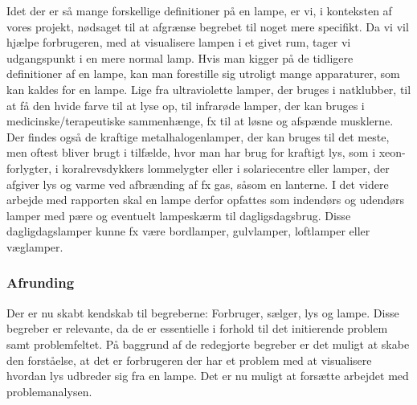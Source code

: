 Idet der er så mange forskellige definitioner på en lampe, er vi, i konteksten af vores projekt, nødsaget til at afgrænse begrebet til noget mere specifikt. Da vi vil hjælpe forbrugeren, med at visualisere lampen i et givet rum, tager vi udgangspunkt i en mere normal lamp. Hvis man kigger på de tidligere definitioner af en lampe, kan man forestille sig utroligt mange apparaturer, som kan kaldes for en lampe. Lige fra ultraviolette lamper, der bruges i natklubber, til at få den hvide farve til at lyse op, til infrarøde lamper, der kan bruges i medicinske/terapeutiske sammenhænge, fx til at løsne og afspænde musklerne. Der findes også de kraftige metalhalogenlamper, der kan bruges til det meste, men oftest bliver brugt i tilfælde, hvor man har brug for kraftigt lys, som i xeon-forlygter, i koralrevsdykkers lommelygter eller i solariecentre \cite{metal_lamper} eller lamper, der afgiver lys og varme ved afbrænding af fx gas, såsom en lanterne. I det videre arbejde med rapporten skal en lampe derfor opfattes som indendørs og udendørs lamper med pære og eventuelt lampeskærm til dagligsdagsbrug. Disse dagligdagslamper kunne fx være bordlamper, gulvlamper, loftlamper eller væglamper. 

\subsubsection{Afrunding}
Der er nu skabt kendskab til begreberne: Forbruger, sælger, lys og lampe. Disse begreber er relevante, da de er essentielle i forhold til det initierende problem samt problemfeltet. På baggrund af de redegjorte begreber er det muligt at skabe den forståelse, at det er forbrugeren der har et problem med at visualisere hvordan lys udbreder sig fra en lampe. Det er nu muligt at forsætte arbejdet med problemanalysen.




